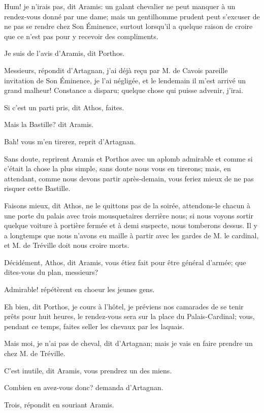 \speak  Hum! je n'irais pas, dit Aramis: un galant chevalier ne peut manquer à un rendez-vous donné par une dame; mais un gentilhomme prudent peut s'excuser de ne pas se rendre chez Son Éminence, surtout lorsqu'il a quelque raison de croire que ce n'est pas pour y recevoir des compliments. 

\speak  Je suis de l'avis d'Aramis, dit Porthos. 

\speak  Messieurs, répondit d'Artagnan, j'ai déjà reçu par M. de Cavois pareille invitation de Son Éminence, je l'ai négligée, et le lendemain il m'est arrivé un grand malheur! Constance a disparu; quelque chose qui puisse advenir, j'irai. 

\speak  Si c'est un parti pris, dit Athos, faites. 

\speak  Mais la Bastille? dit Aramis. 

\speak  Bah! vous m'en tirerez, reprit d'Artagnan. 

\speak  Sans doute, reprirent Aramis et Porthos avec un aplomb admirable et comme si c'était la chose la plus simple, sans doute nous vous en tirerons; mais, en attendant, comme nous devons partir après-demain, vous feriez mieux de ne pas risquer cette Bastille. 

\speak  Faisons mieux, dit Athos, ne le quittons pas de la soirée, attendons-le chacun à une porte du palais avec trois mousquetaires derrière nous; si nous voyons sortir quelque voiture à portière fermée et à demi suspecte, nous tomberons dessus. Il y a longtemps que nous n'avons eu maille à partir avec les gardes de M. le cardinal, et M. de Tréville doit nous croire morts. 

\speak  Décidément, Athos, dit Aramis, vous étiez fait pour être général d'armée; que dites-vous du plan, messieurs? 

\speak  Admirable! répétèrent en choeur les jeunes gens. 

\speak  Eh bien, dit Porthos, je cours à l'hôtel, je préviens nos camarades de se tenir prêts pour huit heures, le rendez-vous sera sur la place du Palais-Cardinal; vous, pendant ce temps, faites seller les chevaux par les laquais. 

\speak  Mais moi, je n'ai pas de cheval, dit d'Artagnan; mais je vais en faire prendre un chez M. de Tréville. 

\speak  C'est inutile, dit Aramis, vous prendrez un des miens. 

\speak  Combien en avez-vous donc? demanda d'Artagnan. 

\speak  Trois, répondit en souriant Aramis. 

